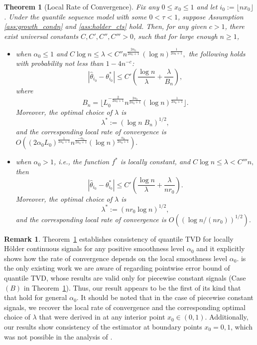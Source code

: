 \documentclass[11pt]{article}
\theoremstyle{plain}
\newtheorem{theorem}{Theorem}[section]
\theoremstyle{definition}
\newtheorem{remark}{Remark}
\theoremstyle{remark}
\begin{document}
\begin{theorem}[Local Rate of Convergence]\label{thm:local_rate_holder}
 Fix any $0\leq x_0\leq 1$ and let $i_0:=\lfloor n x_0\rfloor$. Under the quantile sequence model with some $0<\tau <1$, suppose Assumption \ref{ass:growth_condn} and \ref{ass:holder_cts} hold.
Then, for any given $c>1$, there exist universal constants $C,C',C'', C'''>0$, such that for large enough $n\geq 1$,
\begin{itemize}
    \item [(A)] when $\alpha_0\leq 1$ and $ C \log n\leq \lambda <C'' n^{\frac{2\alpha_0}{2\alpha_0+1}}\,(\log n)^{\frac{1}{2\alpha_0+1}},$ the following holds with probability not less than $1-4n^{-c} $:
    \[|\hat{\theta}_{i_0}-\theta^*_{i_0}|\leq C'\left(\frac{\log n}{\lambda}+\frac{\lambda}{B_n}\right),\]
    where 
   \[B_n=
     \lfloor L_0^{-\frac{2}{2\alpha_0+1}}n^{\frac{2\alpha_0}{2\alpha_0+1}}(\log n)^{\frac{1}{2\alpha_0+1}}\rfloor.\]
   Moreover, the optimal choice of $\lambda$ is 
\[\lambda^*:=(\log n\;B_n)^{1/2},\]
and the corresponding local rate of convergence is \(O\left((2\alpha_0 L_0)^{\frac{1}{2\alpha_0+1}}n^{\frac{-\alpha_0}{2\alpha_0+1}}(\log n)^{\frac{\alpha_0}{2\alpha_0+1}}\right).\)
\item [(B)] when $\alpha_0>1$, i.e., the function $f^*$ is locally constant, and $C \log n\leq \lambda< C''' n,$ then
 \[|\hat{\theta}_{i_0}-\theta^*_{i_0}|\leq C'\left(\frac{\log n}{\lambda}+\frac{\lambda}{nr_0}\right).\]
 Moreover, the optimal choice of $\lambda$ is 
\[\lambda^*:=(nr_0\log n)^{1/2},\]
and the corresponding local rate of convergence is \(O\left((\log n/(nr_0))^{1/2}\right).\)
\end{itemize}
\end{theorem}

\begin{remark}
Theorem~\ref{thm:local_rate_holder} establishes consistency of quantile TVD for locally H\"{o}lder continuous signals for any positive smoothness level $\alpha_0$ and it explicitly shows how the rate of convergence depends on the local smoothness level $\alpha_0$. \cite{zhang2023element} is the only existing work we are aware of regarding pointwise error bound of quantile TVD, whose results are valid only for piecewise constant signals (Case $(B)$ in Theorem~\ref{thm:local_rate_holder}). Thus, our result appears to be the first of its kind that that hold for general $\alpha_0$. It should be noted that in the case of piecewise constant signals, we recover the local rate of convergence and the corresponding optimal choice of $\lambda$ that were derived in \cite{zhang2023element} at any interior point $x_0\in (0,1)$. Additionally, our results show consistency of the estimator at boundary points $x_0=0,1$, which was not possible in the analysis of \cite{zhang2023element}. 
\end{remark}
\end{document}

